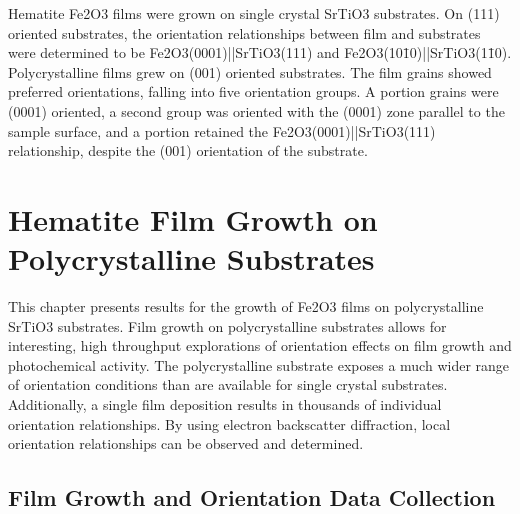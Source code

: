 \documentclass[12pt,%
              twoside,
               letterpaper]{uiothesis}
\begin{document}
Hematite Fe2O3 films were grown on single crystal SrTiO3 substrates. On (111)
oriented substrates, the orientation relationships between film and substrates were
determined to be Fe2O3(0001)||SrTiO3(111) and
Fe2O3(10\={1}0)||SrTiO3(1\={1}0). Polycrystalline films grew on (001) oriented
substrates. The film grains showed preferred orientations, falling into five orientation
groups. A portion grains were (0001) oriented, a second group was oriented with the (0001)
zone parallel to the sample surface, and a portion retained the
Fe2O3(0001)||SrTiO3(111) relationship, despite the (001) orientation of the
substrate.


\chapter{Hematite Film Growth on Polycrystalline Substrates}
\label{ch:polycrystalline.growth}


This chapter presents results for the growth of Fe2O3 films on
polycrystalline SrTiO3 substrates. Film growth on polycrystalline substrates allows
for interesting, high throughput explorations of orientation effects on film growth and
photochemical activity. The polycrystalline substrate exposes a much wider range of
orientation conditions than are available for single crystal substrates. Additionally, a
single film deposition results in thousands of individual orientation relationships. By
using electron backscatter diffraction, local orientation relationships can be observed
and determined. 


\section{Film Growth and Orientation Data Collection}
\label{sec:poly.growth.experimental}
\end{document}
